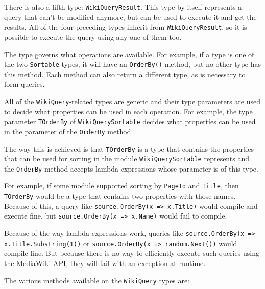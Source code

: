 There is also a fifth type: \lstinline{WikiQueryResult}.
This type by itself represents a query that can't be modified anymore,
but can be used to execute it and get the results.
All of the four preceding types inherit from \lstinline{WikiQueryResult},
so it is possible  to execute the query using any one of them too.

The type governs what operations are available.
For example, if a type is one of the two \lstinline{Sortable} types,
it will have an \lstinline{OrderBy()} method, but no other type has this method.
Each method can also return a different type, as is necessary to form queries.

\medskip

All of the \lstinline{WikiQuery}-related types are generic
and their type parameters are used to decide what properties can be used in each operation.
For example, the type parameter \lstinline{TOrderBy} of \lstinline{WikiQuerySortable}
decides what properties can be used in the parameter of the \lstinline{OrderBy} method.

The way this is achieved is that \lstinline{TOrderBy} is a type that contains the properties that can be
used for sorting in the module \lstinline{WikiQuerySortable} represents
and the \lstinline{OrderBy} method accepts lambda expressions whose parameter is of this type.

For example, if some module supported sorting by \lstinline{PageId} and \lstinline{Title},
then \lstinline{TOrderBy} would be a type that contains two properties with those names.
Because of this, a query like \lstinline{source.OrderBy(x => x.Title)} would compile and execute fine,
but \lstinline{source.OrderBy(x => x.Name)} would fail to compile.

Because of the way lambda expressions work, queries like \lstinline[breaklines=true]{source.OrderBy(x => x.Title.Substring(1))} or \lstinline{source.OrderBy(x => random.Next())} would compile fine.
But because there is no way to efficiently execute such queries using the MediaWiki API,
they will fail with an exception at runtime.

\medskip

The various methods available on the \lstinline{WikiQuery} types are:

